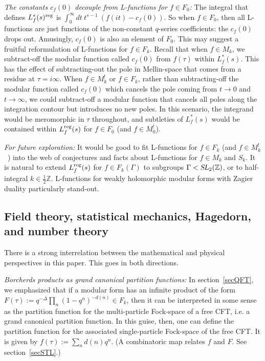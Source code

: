 \documentclass[11pt,a4paper]{article}
\newcommand{\G}{\Gamma}
\def\Z{\mathbb{Z}}
\newcommand{\SL}{\operatorname{\textsl{SL}}}	 	%
\newcommand{\reg}{{\rm reg}}
\begin{document}
{\em The constants $c_f(0)$ decouple from L-functions for $f \in F_0$:} 
The integral that defines $L_f^*(s)^\reg$ is $\int_0^{\infty} dt~t^{s-1}~(f(it)-c_f(0))$. So when $f \in F_0$, then all L-functions are just functions of the non-constant $q$-series coefficients: the $c_f(0)$ drops out. Amusingly, $c_f(0)$ is also an element of $F_0$. This may suggest a fruitful reformulation of L-functions for $f \in F_k$. Recall that when $f \in M_k$, we subtract-off the modular function called $c_f(0)$ from $f(\tau)$ within $L_f^*(s)$. This has the effect of subtracting-out the pole in Mellin-space that comes from a residue at $\tau = i \infty$. When $f \in M_k^!$ or $f \in F_k$, rather than subtracting-off the modular function called $c_f(0)$ which cancels the pole coming from $t \to 0$ and $t \to \infty$, we could subtract-off a modular function that cancels all poles along the integration contour but introduces no new poles. In this scenario, the integrand would be meromorphic in $\tau$ throughout, and subtleties of $L_f^*(s)$ would be contained within $L_f^\reg(s)$ for $f \in F_0$ (and $f \in M_0^!$).

{\em For future exploration:} 
It would be good to fit L-functions for $f \in F_k$ (and $f \in M_k^!$~\cite{04-BFK, 05-BFK2}) 
into the web of conjectures and facts about L-functions for $f \in M_k$ and $S_k$. It is natural to extend $L_f^\reg(s)$ for $f \in F_k(\G)$ to subgroups $\G < \SL_2(\Z)$, or to half-integral $k \in \tfrac12 \Z$. L-functions for weakly holomorphic modular forms with Zagier duality particularly stand-out. 

\subsection{Field theory, statistical mechanics, Hagedorn, and number theory}

There is a strong interrelation between the mathematical and physical perspectives in this paper. This goes in both directions. 


{\em Borcherds products as grand canonical partition functions:} In section~\ref{secQFT}, we emphasized that if a modular form has an infinite product of the form $F(\tau):= q^{-\Delta} \prod_n (1-q^n)^{-d(n)} \in F_k$, then it can be interpreted in some sense as the partition function for the multi-particle Fock-space of a free CFT, i.e. a grand canonical partition function. In this guise, then, one can define the partition function for the associated single-particle Fock-space of the free CFT. It is given by $f(\tau):= \sum_n d(n) q^n$. (A combinatoric map relates $f$ and $F$. See section~\ref{secSTL}.) 
\end{document}
